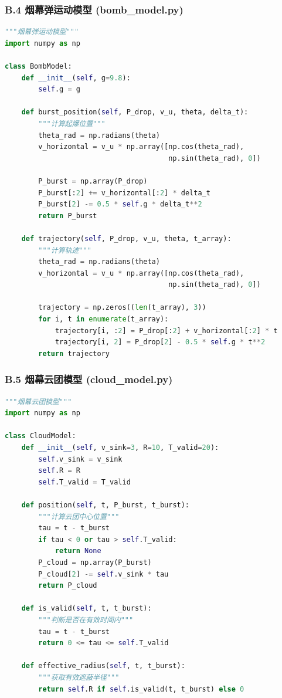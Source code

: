 \documentclass[12pt,a4paper]{article}
\begin{document}
\subsubsection*{B.4 烟幕弹运动模型 (bomb\_model.py)}

\begin{lstlisting}[language=Python]
"""烟幕弹运动模型"""
import numpy as np

class BombModel:
    def __init__(self, g=9.8):
        self.g = g
    
    def burst_position(self, P_drop, v_u, theta, delta_t):
        """计算起爆位置"""
        theta_rad = np.radians(theta)
        v_horizontal = v_u * np.array([np.cos(theta_rad), 
                                       np.sin(theta_rad), 0])
        
        P_burst = np.array(P_drop)
        P_burst[:2] += v_horizontal[:2] * delta_t
        P_burst[2] -= 0.5 * self.g * delta_t**2
        return P_burst
    
    def trajectory(self, P_drop, v_u, theta, t_array):
        """计算轨迹"""
        theta_rad = np.radians(theta)
        v_horizontal = v_u * np.array([np.cos(theta_rad), 
                                       np.sin(theta_rad), 0])
        
        trajectory = np.zeros((len(t_array), 3))
        for i, t in enumerate(t_array):
            trajectory[i, :2] = P_drop[:2] + v_horizontal[:2] * t
            trajectory[i, 2] = P_drop[2] - 0.5 * self.g * t**2
        return trajectory
\end{lstlisting}

\subsubsection*{B.5 烟幕云团模型 (cloud\_model.py)}

\begin{lstlisting}[language=Python]
"""烟幕云团模型"""
import numpy as np

class CloudModel:
    def __init__(self, v_sink=3, R=10, T_valid=20):
        self.v_sink = v_sink
        self.R = R
        self.T_valid = T_valid
    
    def position(self, t, P_burst, t_burst):
        """计算云团中心位置"""
        tau = t - t_burst
        if tau < 0 or tau > self.T_valid:
            return None
        P_cloud = np.array(P_burst)
        P_cloud[2] -= self.v_sink * tau
        return P_cloud
    
    def is_valid(self, t, t_burst):
        """判断是否在有效时间内"""
        tau = t - t_burst
        return 0 <= tau <= self.T_valid
    
    def effective_radius(self, t, t_burst):
        """获取有效遮蔽半径"""
        return self.R if self.is_valid(t, t_burst) else 0
\end{lstlisting}
\end{document}
